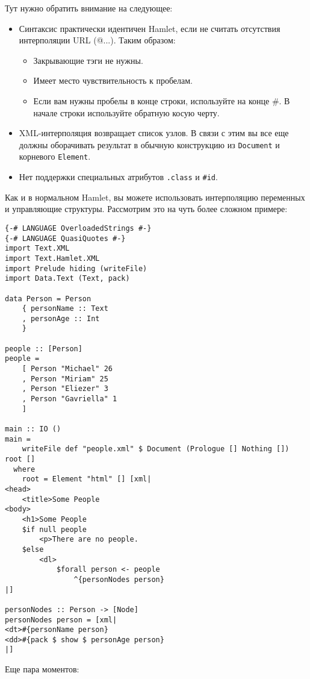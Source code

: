 Тут нужно обратить внимание на следующее:

\begin{itemize}
  \item Синтаксис практически идентичен Hamlet, если не считать отсутствия интерполяции URL (@{...}). Таким образом:
    \begin{itemize}
      \item Закрывающие тэги не нужны.
      \item Имеет место чувствительность к пробелам.
      \item Если вам нужны пробелы в конце строки, используйте на конце \#. В начале строки используйте обратную косую черту.
    \end{itemize}
  
  \item XML-интерполяция возвращает список узлов. В связи с этим вы все еще должны оборачивать результат в обычную конструкцию из \lstinline!Document! и корневого \lstinline!Element!.
  \item Нет поддержки специальных атрибутов \lstinline!.class! и \lstinline!#id!.
\end{itemize}

Как и в нормальном Hamlet, вы можете использовать интерполяцию переменных и управляющие структуры. Рассмотрим это на чуть более сложном примере:

\begin{lstlisting}
{-# LANGUAGE OverloadedStrings #-}
{-# LANGUAGE QuasiQuotes #-}
import Text.XML
import Text.Hamlet.XML
import Prelude hiding (writeFile)
import Data.Text (Text, pack)

data Person = Person
    { personName :: Text
    , personAge :: Int
    }

people :: [Person]
people =
    [ Person "Michael" 26
    , Person "Miriam" 25
    , Person "Eliezer" 3
    , Person "Gavriella" 1
    ]

main :: IO ()
main =
    writeFile def "people.xml" $ Document (Prologue [] Nothing []) root []
  where
    root = Element "html" [] [xml|
<head>
    <title>Some People
<body>
    <h1>Some People
    $if null people
        <p>There are no people.
    $else
        <dl>
            $forall person <- people
                ^{personNodes person}
|]

personNodes :: Person -> [Node]
personNodes person = [xml|
<dt>#{personName person}
<dd>#{pack $ show $ personAge person}
|]
\end{lstlisting}%

Еще пара моментов:

